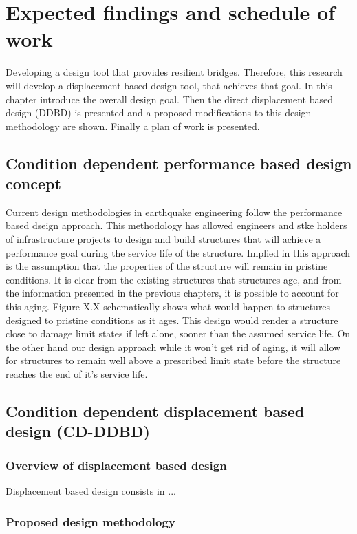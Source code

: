 \chapter{Expected findings and schedule of work}
Developing a design tool that provides resilient bridges. Therefore, this research will develop a displacement based design tool, that achieves that goal. In this chapter introduce the overall design goal. Then the direct displacement based design (DDBD) is presented and a proposed modifications to this design methodology are shown. Finally a plan of work is presented.

\section{Condition dependent performance based design concept}

Current design methodologies in earthquake engineering follow the performance based dseign approach. This methodology has allowed engineers and stke holders of infrastructure projects to design and build structures that will achieve a performance goal during the service life of the structure. Implied in this approach is the assumption that the properties of the structure will remain in pristine conditions. It is clear from the existing structures that structures age, and from the information presented in the previous chapters, it is possible to account for this aging. Figure X.X schematically shows what would happen to structures designed to pristine conditions as it ages. This design would render a structure close to damage limit states if left alone, sooner than the assumed service life. On the other hand our design approach while it won't get rid of aging, it will allow for structures to remain well above a prescribed limit state before the structure reaches the end of it's service life. 

\section{Condition dependent displacement based design (CD-DDBD)}
\subsection{Overview of displacement based design}

Displacement based design consists in ...

\subsection{Proposed design methodology}

